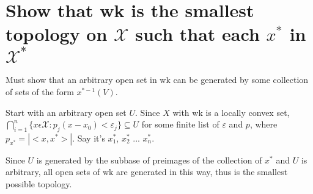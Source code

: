 \documentclass{article}
\begin{document}
\section{Show that wk is the smallest topology on $\mathscr{X}$ such that each $x^*$ in $\mathscr{X}^*$}

Must show that an arbitrary open set in wk can be generated by some collection of sets of the form $x^{*-1}(V)$.

Start with an arbitrary open set $U$. Since $X$ with wk is a locally convex set, $\bigcap^n_{i=1}\{x\epsilon \mathscr{X} : p_j( x-x_0) < \varepsilon_j\} \subseteq U$ for some finite list of $\varepsilon$ and $p$, where $p_{x^*}=|<x,x^*>|$. Say it's $x_1^*$, $x_2^*$ ... $x_n^*$.

Since $U$ is generated by the subbase of preimages of the collection of $x^*$ and $U$ is arbitrary, all open sets of wk are generated in this way, thus is the smallest possible topology.
\end{document}
